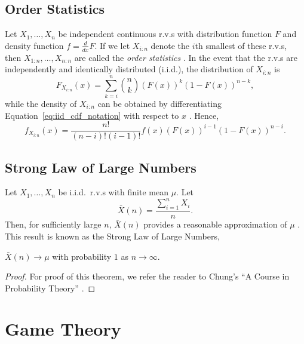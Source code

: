 \subsection{Order Statistics} %
\label{sub:order_statistics_notation}
Let $X_1, \ldots, X_n$ be independent continuous r.v.s with distribution function $F$ and density function $f= \frac{d}{dx}F$. If we let $X_{i:n}$ denote the $i$th smallest of these r.v.s, then $X_{1:n}, \ldots,X_{n:n}$ are called the \emph{order statistics} \cite{Arnold08,David03}. In the event that the r.v.s are independently and identically distributed (i.i.d.), the distribution of $X_{i:n}$ is
\begin{equation}
	\label{eq:iid_cdf_notation}
	F_{X_{i:n}}(x) = \sum_{k=i}^{n} \binom{n}{k} (F(x))^k (1-F(x))^{n-k},
\end{equation}
while the density of $X_{i:n}$ can be obtained by differentiating Equation~\eqref{eq:iid_cdf_notation} with respect to $x$ \cite{Ross10}. Hence,
\begin{equation}
	\label{eq:iid_pdf_notation}
	f_{X_{i:n}}(x) = \frac{n!}{(n-i)!(i-1)!} f(x) (F(x))^{i-1} (1-F(x))^{n-i}.
\end{equation}

\subsection{Strong Law of Large Numbers} %
\label{sub:strong_law_of_large_numbers_notation}
Let $X_1,\ldots,X_n$ be i.i.d.~r.v.s with finite mean $\mu$. Let
\begin{equation}
  \bar{X}(n) = \frac{\sum_{i=1}^n X_i}{n}.
\end{equation}
Then, for sufficiently large $n$, $\bar{X}(n)$ provides a reasonable approximation of $\mu$ \cite{LawChapter42007}. This result is known as the Strong Law of Large Numbers,
\begin{thm}
$\bar{X}(n)\rightarrow\mu$ with probability $1$ as $n\rightarrow\infty$.
\end{thm}
\begin{proof}
For proof of this theorem, we refer the reader to Chung's ``A Course in Probability Theory'' \cite{Chung2001}.
\end{proof}

\section{Game Theory} %
\label{sec:theory_of_games_notation}

